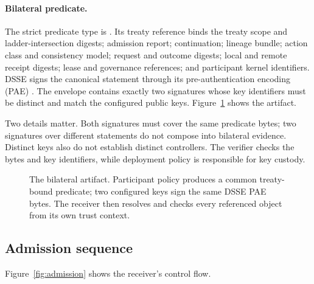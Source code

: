 \paragraph{Bilateral predicate.}
The strict predicate type is . Its treaty reference binds the treaty scope and ladder-intersection digests; admission report; continuation; lineage bundle; action class and consistency model; request and outcome digests; local and remote receipt digests; lease and governance references; and participant kernel identifiers. DSSE signs the canonical statement through its pre-authentication encoding (PAE) \cite{dsse}. The envelope contains exactly two signatures whose key identifiers must be distinct and match the configured public keys. Figure~\ref{fig:treaty} shows the artifact.

Two details matter. Both signatures must cover the same predicate bytes; two
signatures over different statements do not compose into bilateral evidence.
Distinct keys also do not establish distinct controllers. The verifier checks
the bytes and key identifiers, while deployment policy is responsible for key
custody.

\begin{figure}[t]
  \centering
  \resizebox{.83\textwidth}{!}{}
  \caption{The bilateral artifact. Participant policy produces a common treaty-bound predicate; two configured keys sign the same DSSE PAE bytes. The receiver then resolves and checks every referenced object from its own trust context.}
  \label{fig:treaty}
\end{figure}

\subsection{Admission sequence}

Figure~\ref{fig:admission} shows the receiver's control flow.

